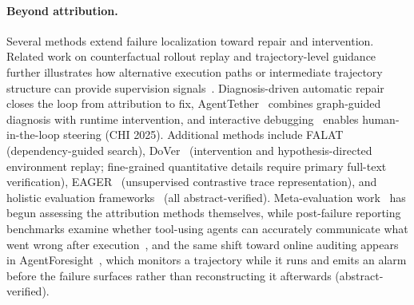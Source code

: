\paragraph*{Beyond attribution.}
Several methods extend failure localization toward repair and intervention. Related work on counterfactual rollout replay and trajectory-level guidance further illustrates how alternative execution paths or intermediate trajectory structure can provide supervision signals~\cite{li2026counterfactualrolloutreplayforkable,jiang2026bridgingreasoningtrajectoriesonpolicy}. Diagnosis-driven automatic repair~\cite{diagrepair2026} closes the loop from attribution to fix, AgentTether~\cite{agenttether2026} combines graph-guided diagnosis with runtime intervention, and interactive debugging~\cite{interactivedebug2025} enables human-in-the-loop steering (CHI 2025). Additional methods include FALAT~\cite{falat2026} (dependency-guided search), DoVer~\cite{dover2026} (intervention and hypothesis-directed environment replay; fine-grained quantitative details require primary full-text verification), EAGER~\cite{eager2026} (unsupervised contrastive trace representation), and holistic evaluation frameworks~\cite{holisticeval2026} (all abstract-verified). Meta-evaluation work~\cite{whwhpro2026} has begun assessing the attribution methods themselves, while post-failure reporting benchmarks examine whether tool-using agents can accurately communicate what went wrong after execution~\cite{zhu2026failure}, and the same shift toward online auditing appears in AgentForesight~\cite{agentforesight2026}, which monitors a trajectory while it runs and emits an alarm before the failure surfaces rather than reconstructing it afterwards (abstract-verified).

